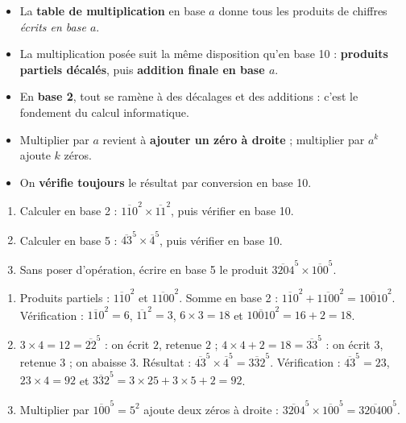\documentclass[11pt]{article}
\begin{document}
\begin{aretenir}
\begin{itemize}
\item La \textbf{table de multiplication} en base $a$ donne tous les produits de chiffres \emph{écrits en base $a$}.
\item La multiplication posée suit la même disposition qu'en base 10 : \textbf{produits partiels décalés}, puis \textbf{addition finale en base $a$}.
\item En \textbf{base 2}, tout se ramène à des décalages et des additions : c'est le fondement du calcul informatique.
\item Multiplier par $a$ revient à \textbf{ajouter un zéro à droite} ; multiplier par $a^k$ ajoute $k$ zéros.
\item On \textbf{vérifie toujours} le résultat par conversion en base 10.
\end{itemize}
\end{aretenir}

\begin{exercice}
\begin{enumerate}
\item Calculer en base 2 : $\overline{110}^{2} \times \overline{11}^{2}$, puis vérifier en base 10.
\item Calculer en base 5 : $\overline{43}^{5} \times \overline{4}^{5}$, puis vérifier en base 10.
\item Sans poser d'opération, écrire en base 5 le produit $\overline{3204}^{5} \times \overline{100}^{5}$.
\end{enumerate}
\end{exercice}

\begin{corrige}[Exercice]
\begin{enumerate}
\item Produits partiels : $\overline{110}^{2}$ et $\overline{1100}^{2}$. Somme en base 2 : $\overline{110}^{2} + \overline{1100}^{2} = \overline{10010}^{2}$. Vérification : $\overline{110}^{2} = 6$, $\overline{11}^{2} = 3$, $6 \times 3 = 18$ et $\overline{10010}^{2} = 16 + 2 = 18$.
\item $3 \times 4 = 12 = \overline{22}^{5}$ : on écrit $2$, retenue $2$ ; $4 \times 4 + 2 = 18 = \overline{33}^{5}$ : on écrit $3$, retenue $3$ ; on abaisse $3$. Résultat : $\overline{43}^{5} \times \overline{4}^{5} = \overline{332}^{5}$. Vérification : $\overline{43}^{5} = 23$, $23 \times 4 = 92$ et $\overline{332}^{5} = 3 \times 25 + 3 \times 5 + 2 = 92$.
\item Multiplier par $\overline{100}^{5} = 5^2$ ajoute deux zéros à droite : $\overline{3204}^{5} \times \overline{100}^{5} = \overline{320400}^{5}$.
\end{enumerate}
\end{corrige}
\end{document}
